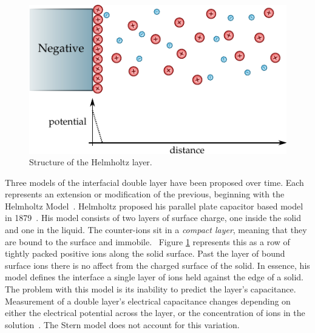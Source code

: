     \begin{figure}
      \begin{center}
        \includegraphics{content/introduction/graphics/model_helmholtz}
      \end{center}
      \caption{Structure of the Helmholtz layer.}
      \label{fig:doubleLayerModel_helmholtz}
    \end{figure}
    Three models of the interfacial double layer have been proposed over time.
    Each represents an extension or modification of the previous, beginning with the Helmholtz Model~\cite{Horch2004}.
    Helmholtz proposed his parallel plate capacitor based model in 1879~\cite{Geddes1997}.
    His model consists of two layers of surface charge, one inside the solid and one in the liquid.
    The counter-ions sit in a \emph{compact layer}, meaning that they are bound to the surface and immobile.~\cite{Salieb-Beugelaar2009}
    Figure \ref{fig:doubleLayerModel_helmholtz} represents this as a row of tightly packed positive ions along the solid surface.
    Past the layer of bound surface ions there is no affect from the charged surface of the solid.
    In essence, his model defines the interface a single layer of ions held against the edge of a solid.
    The problem with this model is its inability to predict the layer's capacitance.
    Measurement of a double layer's electrical capacitance changes depending on either the electrical potential across the layer, or the concentration of ions in the solution~\cite{Bard1980}.
    The Stern model does not account for this variation.

